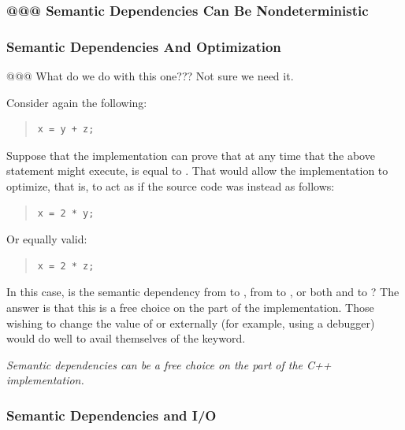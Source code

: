 \documentclass[10]{article}
\begin{document}
\subsubsection{@@@ Semantic Dependencies Can Be Nondeterministic}
\label{sec:Semantic Dependencies Can Be Nondeterministic}

\subsubsection{Semantic Dependencies And Optimization}
\label{sec:Semantic Dependencies And Optimization}

@@@ What do we do with this one???  Not sure we need it.

Consider again the following:

\begin{quote}
\begin{verbatim}
x = y + z;
\end{verbatim}
\end{quote}

Suppose that the implementation can prove that at any time that
the above statement might execute,  is equal to .
That would allow the implementation to optimize, that is, to act as if
the source code was instead as follows:

\begin{quote}
\begin{verbatim}
x = 2 * y;
\end{verbatim}
\end{quote}

Or equally valid:

\begin{quote}
\begin{verbatim}
x = 2 * z;
\end{verbatim}
\end{quote}

In this case, is the semantic dependency from  to ,
from  to , or both  and  to ?
The answer is that this is a free choice on the part of the
implementation.
Those wishing to change the value of  or  externally
(for example, using a debugger) would do well to avail themselves
of the  keyword.

\emph{Semantic dependencies can be a free choice on the part of the
C++ implementation.}

\subsubsection{Semantic Dependencies and I/O}
\label{sec:Semantic Dependencies and I/O}
\end{document}

